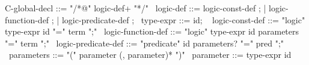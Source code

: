 \begin{syntax}
  C-global-decl ::= "/*@" logic-def+ "*/"
  \
  logic-def ::= { logic-const-def } ;
          | logic-function-def ;
          | logic-predicate-def ;
  \
  type-expr ::= id;
  \
  { logic-const-def } ::= { "logic" type-expr id "=" term ";" }
  \
  logic-function-def ::= "logic" type-expr id parameters "=" term ";"
  \
  logic-predicate-def ::= "predicate" id parameters? "=" pred ";"
  \
  parameters ::= "(" parameter (, parameter)* ")"
  \
  parameter ::= type-expr id
\end{syntax}
